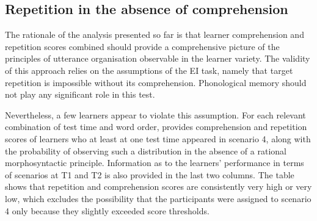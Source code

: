 \subsection{Repetition in the absence of comprehension}\label{sec:06:4.1}

The rationale of the analysis presented so far is that learner comprehension and repetition scores combined should provide a comprehensive picture of the principles of utterance organisation observable in the learner variety. The validity of this approach relies on the assumptions of the EI task, namely that target repetition is impossible without its comprehension. Phonological memory should not play any significant role in this test. 

Nevertheless, a few learners appear to violate this assumption. For each relevant combination of test time and word order,  provides comprehension and repetition scores of learners who at least at one test time appeared in scenario 4, along with the probability of observing such a distribution in the absence of a rational morphosyntactic principle. Information as to the learners' performance in terms of scenarios at T1 and T2 is also provided in the last two columns. The table shows that repetition and comprehension scores are consistently very high or very low, which excludes the possibility that the participants were assigned to scenario 4 only because they slightly exceeded score thresholds. 

